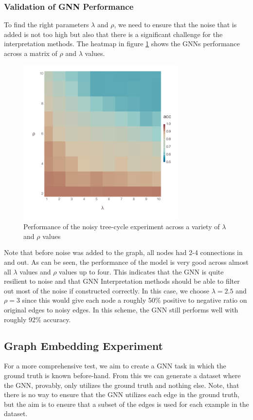 \subsubsection{Validation of GNN Performance}
To find the right parameters $\lambda$ and $\rho$, we need to ensure that the noise that is added is not too high but also that there is a significant challenge for the interpretation methods. The heatmap in figure \ref{fig:gnn-deg} shows the GNNs performance across a matrix of $\rho$ and $\lambda$ values.
\begin{figure}[h]
	\centering
	\includegraphics[width=0.75\textwidth]{images/gnn-noise-deg.pdf}
	\caption{Performance of the noisy tree-cycle experiment across a variety of $\lambda$ and $\rho$ values}
	\label{fig:gnn-deg}
\end{figure}

Note that before noise was added to the graph, all nodes had 2-4 connections in and out. As can be seen, the performance of the model is very good across almost all $\lambda$ values and $\rho$ values up to four. This indicates that the GNN is quite resilient to noise and that GNN Interpretation methods should be able to filter out most of the noise if constructed correctly. In this case, we choose $\lambda = 2.5$ and $\rho = 3$ since this would give each node a roughly 50\% positive to negative ratio on original edges to noisy edges. In this scheme, the GNN still performs well with roughly 92\% accuracy.

\subsection{Graph Embedding Experiment}
For a more comprehensive test, we aim to create a GNN task in which the ground truth is known before-hand. From this we can generate a dataset where the GNN, provably, only utilizes the ground truth and nothing else. Note, that there is no way to ensure that the GNN utilizes each edge in the ground truth, but the aim is to ensure that a subset of the edges is used for each example in the dataset.

